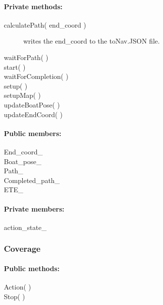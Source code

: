 \paragraph{Private methods:}
\begin{adjustwidth}{2.5em}{0pt}\begin{description}
		\item [calculatePath( end_coord )] writes the end_coord to the toNav.JSON file.
		\item [waitForPath( )]
		\item [start( )]
		\item [waitForCompletion( )]
		\item [setup( )]
		\item [setupMap( )]
		\item [updateBoatPose( )]
		\item [updateEndCoord( )]
\end{description}\end{adjustwidth}

\paragraph{Public members:}
\begin{adjustwidth}{2.5em}{0pt}\begin{description}
		\item [End_coord_]
		\item [Boat_pose_]
		\item [Path_]
		\item[Completed_path_]
		\item[ETE_] 
\end{description}\end{adjustwidth}


\paragraph{Private members:}
\begin{adjustwidth}{2.5em}{0pt}\begin{description}
		\item [action_state_] 
\end{description}\end{adjustwidth}

\subsubsection{Coverage}

\paragraph{Public methods:}
\begin{adjustwidth}{2.5em}{0pt}\begin{description}
		\item [Action( )]
		\item [Stop( )] 
\end{description}\end{adjustwidth}

